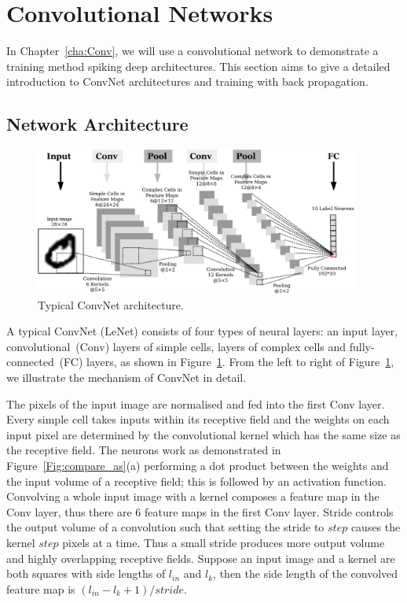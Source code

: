 \section{Convolutional Networks}
\label{sec:convnet}
In Chapter~\ref{cha:Conv}, we will use a convolutional network to demonstrate a training method \protect{} \protect{} spiking deep architectures.
This section aims to give a detailed introduction to ConvNet architectures and \protect{} \protect{} training with back propagation.
\subsection{Network Architecture}

	\begin{figure}[bt]
		\centering
		\includegraphics[width=0.95\textwidth]{pics_snn/convnet.pdf}
		\caption{Typical ConvNet architecture.}
		\label{Fig:ConvNet}
	\end{figure}

A typical ConvNet (LeNet) consists of four types of neural layers: an input layer, convolutional~(Conv) layers of simple cells, \protect{} \protect{} layers of complex cells and fully-connected~(FC) layers, as shown in Figure~\ref{Fig:ConvNet}.
From the left to right of Figure~\ref{Fig:ConvNet}, we illustrate the mechanism of \protect{} ConvNet in detail.

The pixels of the input image are normalised and fed into the first Conv layer.
Every simple cell takes inputs within its receptive field and the weights on each input pixel are determined by the convolutional kernel which has the same size as the receptive field.
The neurons work as demonstrated in Figure~\ref{Fig:compare_as}(a) performing a dot product between the weights and the input volume of a receptive field; this is followed by an activation function.
Convolving a whole input image with a kernel composes a feature map in the Conv layer, thus there are 6 feature maps in the first Conv layer.
Stride controls the output volume of a convolution such that setting the stride to $step$ causes the kernel \protect{} \protect{} $step$ pixels at a time.
Thus a small stride produces more output volume and highly overlapping receptive fields.
Suppose an input image and a kernel are both squares with side lengths of $l_{in}$ and $l_k$, then the side length of the convolved feature map is $(l_{in} - l_k + 1)/stride$.

